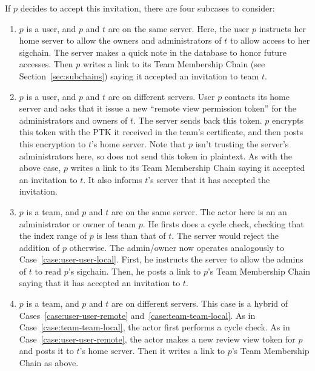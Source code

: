 If $p$ decides to accept this invitation, there are four subcases to consider:

\begin{enumerate}
\item $p$ is a user, and $p$ and $t$ are on the same server.
%
Here, the user $p$
instructs her home server to allow the owners and administrators of $t$ to allow
access to her sigchain. The server makes a quick note in the database to honor
future accesses. Then $p$ writes a link to its Team Membership Chain (see Section~\ref{sec:subchains}) 
saying it accepted an invitation to team $t$.
\label{case:user-user-local}

\item $p$ is a user, and $p$ and $t$ are on different servers.
%
User $p$ contacts its home server and asks that it issue a new 
``remote view permission token'' for the administrators and owners of $t$.
The server sends back this token. $p$ encrypts this token with the PTK
it received in the team's certificate, and then posts this encryption to
$t$'s home server. Note that $p$ isn't trusting the server's administrators 
here, so does not send this token in plaintext. As with the above case,
$p$ writes a link to its Team Membership Chain saying it accepted an invitation
to $t$. It also informs $t$'s server that it has accepted the invitation.
\label{case:user-user-remote}

\item $p$ is a team, and $p$ and $t$ are on the same server. 
% 
The actor here is an an administrator or owner of team $p$. He firsts does a
cycle check, checking that the index range of $p$ is less than that of $t$.
The server would reject the addition of $p$ otherwise. The admin/owner now
operates analogously to Case~\ref{case:user-user-local}.  First, he
instructs the server to allow the admins of $t$ to read $p$'s sigchain.
Then, he posts a link to $p$'s Team Membership Chain saying that it has
accepted an invitation to $t$.
\label{case:team-team-local}
    
\item $p$ is a team, and $p$ and $t$ are on different servers.
%
This case is a hybrid of Cases~\ref{case:user-user-remote} and~\ref{case:team-team-local}.
As in Case~\ref{case:team-team-local}, the actor first performs a cycle check.
As in Case~\ref{case:user-user-remote}, the actor makes a new review view token
for $p$ and posts it to $t$'s home server. Then it writes a link to $p$'s
Team Membership Chain as above.
\label{case:team-team-remote}

\end{enumerate}

